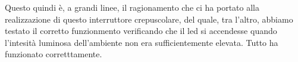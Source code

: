 Questo quindi è, a grandi linee, il ragionamento che ci ha portato alla realizzazione di questo interruttore crepuscolare, del quale, tra l'altro, abbiamo testato il corretto funzionmento verificando che il led si accendesse quando l'intesità luminosa dell'ambiente non era sufficientemente elevata. Tutto ha funzionato corretttamente.
